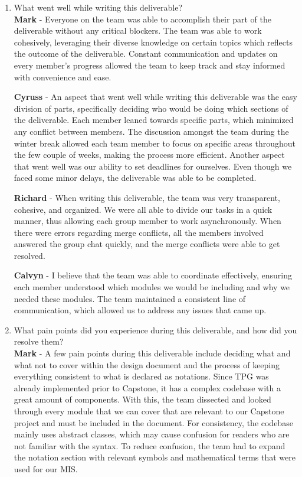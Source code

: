 \documentclass[12pt, titlepage]{article}
\begin{document}

% 

\begin{enumerate}
  \item What went well while writing this deliverable?\\
  

  \textbf{Mark} - Everyone on the team was able to accomplish their part of the deliverable without any critical blockers. The team was able to work cohesively, leveraging their diverse knowledge on certain topics which reflects the outcome of the deliverable. Constant communication and updates on every member’s progress allowed the team to keep track and stay informed with convenience and ease.

  \textbf{Cyruss} -  An aspect that went well while writing this deliverable was the easy division of parts, specifically deciding who would be doing which sections of the deliverable. Each member leaned towards specific parts, which minimized any conflict between members. The discussion amongst the team during the winter break allowed each team member to focus on specific areas throughout the few couple of weeks, making the process more efficient. Another aspect that went well was our ability to set deadlines for ourselves. Even though we faced some minor delays, the deliverable was able to be completed.
  
  \textbf{Richard} - When writing this deliverable, the team was very transparent, cohesive, and organized. We were all able to divide our tasks in a quick manner, thus allowing each group member to work asynchronously. When there were errors regarding merge conflicts, all the members involved answered the group chat quickly, and the merge conflicts were able to get resolved.
  
  
  \textbf{Calvyn} - I believe that the team was able to coordinate effectively, ensuring each member understood which modules we would be including and why we needed these modules. The team maintained a consistent line of communication, which allowed us to address any issues that came up.
  

  \item What pain points did you experience during this deliverable, and how
    did you resolve them?\\

    \textbf{Mark} - A few pain points during this deliverable include deciding what and what not to cover within the design document and the process of keeping everything consistent to what is declared as notations. Since TPG was already implemented prior to Capstone, it has a complex codebase with a great amount of components. With this, the team dissected and looked through every module that we can cover that are relevant to our Capstone project and must be included in the document. For consistency, the codebase mainly uses abstract classes, which may cause confusion for readers who are not familiar with the syntax. To reduce confusion, the team had to expand the notation section with relevant symbols and mathematical terms that were used for our MIS.


\end{enumerate}
\end{document}
